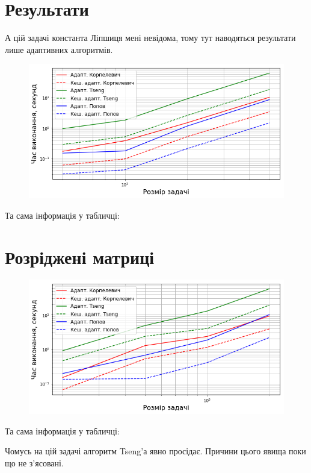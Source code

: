 \section{Результати}

А цій задачі константа Ліпшиця мені невідома, тому тут наводяться результати лише адаптивних алгоритмів.

\begin{figure}[H]
    \centering
    \includegraphics[width=.75\textwidth]{img/4/adapt/time.png}
\end{figure}

Та сама інформація у табличці:





\section{Розріджені матриці}

\begin{figure}[H]
    \centering
    \includegraphics[width=.75\textwidth]{img/4/sparse/adapt/time.png}
\end{figure}

Та сама інформація у табличці:





Чомусь на цій задачі алгоритм Tseng'а явно просідає. Причини цього явища поки що не з'ясовані.
